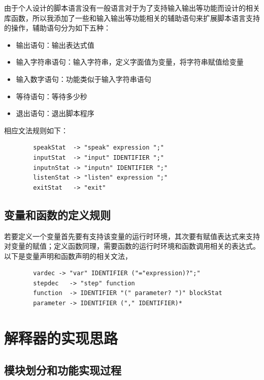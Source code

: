 \documentclass[12pt]{article}
\begin{document}
    由于个人设计的脚本语言没有一般语言对于为了支持输入输出等功能而设计的相关库函数，所以我添加了一些和输入输出等功能相关的辅助语句来扩展脚本语言支持的操作，辅助语句分为如下五种：

    \begin{itemize}
        \item 输出语句：输出表达式值
        \item 输入字符串语句：输入字符串，定义字面值为变量，将字符串赋值给变量
        \item 输入数字语句：功能类似于输入字符串语句
        \item 等待语句：等待多少秒
        \item 退出语句：退出脚本程序
    \end{itemize}

    相应文法规则如下：

    \begin{verbatim}
        speakStat  -> "speak" expression ";"
        inputStat  -> "input" IDENTIFIER ";"
        inputnStat -> "inputn" IDENTIFIER ";"
        listenStat -> "listen" expression ";"
        exitStat   -> "exit"
    \end{verbatim}

    \subsection{变量和函数的定义规则}\label{vars}

    若要定义一个变量首先要有支持该变量的运行时环境，其次要有赋值表达式来支持对变量的赋值；定义函数同理，需要函数的运行时环境和函数调用相关的表达式。以下是变量声明和函数声明的相关文法，

    \begin{verbatim}
        vardec -> "var" IDENTIFIER ("="expression)?";"
        stepdec   -> "step" function
        function  -> IDENTIFIER "(" parameter? ")" blockStat
        parameter -> IDENTIFIER ("," IDENTIFIER)*
    \end{verbatim}
    
    \section{解释器的实现思路}

    \subsection{模块划分和功能实现过程}\label{mod}
\end{document}
